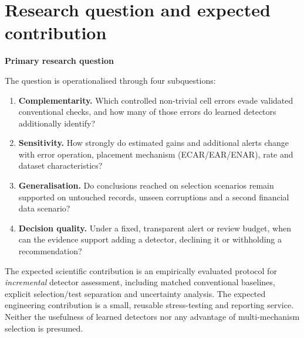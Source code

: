 \documentclass[10pt,a4paper]{article}
\begin{document}
\section{Research question and expected contribution}
\noindent\textbf{Primary research question}\par
\vspace{2pt}
\noindent{}

\noindent The question is operationalised through four subquestions:
\begin{enumerate}
\item \textbf{Complementarity.} Which controlled non-trivial cell errors evade validated conventional checks, and how many of those errors do learned detectors additionally identify?
\item \textbf{Sensitivity.} How strongly do estimated gains and additional alerts change with error operation, placement mechanism (ECAR/EAR/ENAR), rate and dataset characteristics?
\item \textbf{Generalisation.} Do conclusions reached on selection scenarios remain supported on untouched records, unseen corruptions and a second financial data scenario?
\item \textbf{Decision quality.} Under a fixed, transparent alert or review budget, when can the evidence support adding a detector, declining it or withholding a recommendation?
\end{enumerate}

The expected scientific contribution is an empirically evaluated protocol for \emph{incremental} detector assessment, including matched conventional baselines, explicit selection/test separation and uncertainty analysis. The expected engineering contribution is a small, reusable stress-testing and reporting service. Neither the usefulness of learned detectors nor any advantage of multi-mechanism selection is presumed.
\end{document}
